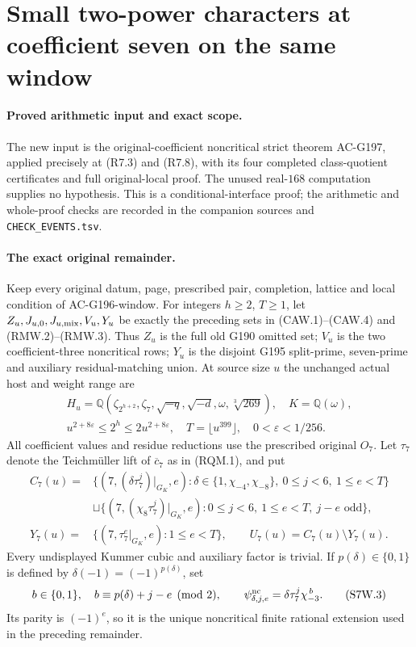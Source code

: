 \section{Small two-power characters at coefficient seven on the same window}
\label{sec:coefficient-seven-actual-window}

\paragraph{Proved arithmetic input and exact scope.}
The new input is the original-coefficient noncritical strict theorem
AC-G197, applied precisely at (R7.3) and (R7.8), with its four
completed class-quotient certificates and full original-local proof.
The unused real-$168$ computation supplies no hypothesis.
This is a conditional-interface proof; the arithmetic and whole-proof
checks are recorded in the companion sources and \texttt{CHECK\_EVENTS.tsv}.

\paragraph{The exact original remainder.}
Keep every original datum, page, prescribed pair, completion, lattice
and local condition of AC-G196-window. For integers $h\geq2$,
$T\geq1$, let $Z_u,J_{u,0},J_{u,\rm mix},V_u,Y_u$ be exactly
the preceding sets in (CAW.1)--(CAW.4) and (RMW.2)--(RMW.3).
Thus $Z_u$ is the full old G190 omitted set; $V_u$ is the two
coefficient-three noncritical rows; $Y_u$ is the disjoint G195
split-prime, seven-prime and auxiliary residual-matching union.
At source size $u$ the unchanged actual host and weight range are
\[
 \begin{gathered}
 H_u=\mathbb Q(\zeta_{2^{h+2}},\zeta_7,\sqrt{-q},\sqrt{-d},
                          \omega,\sqrt[3]{269}),\quad K=\mathbb Q(\omega),\\
 u^{2+8\varepsilon}\leq2^h\leq2u^{2+8\varepsilon},\quad
 T=\lfloor u^{399}\rfloor,\quad0<\varepsilon<1/256.
 \end{gathered}\tag{S7W.1}
\]
All coefficient values and residue reductions use the prescribed
original $O_7$. Let $\tau_7$ denote the Teichm\"uller lift of
$\overline c_7$ as in (RQM.1), and put
\[
 \begin{split}
 C_7(u)={}&\{(7,(\delta\tau_7^j)|_{G_K},e):
       \delta\in\{1,\chi_{-4},\chi_{-8}\},\ 0\leq j<6,\ 1\leq e<T\}\\
 &\sqcup\{(7,(\chi_8\tau_7^j)|_{G_K},e):
                    0\leq j<6,\ 1\leq e<T,\ j-e\text{ odd}\},\\
 Y_7(u)={}&\{(7,\tau_7^e|_{G_K},e):1\leq e<T\},\qquad
 U_7(u)=C_7(u)\setminus Y_7(u).
 \end{split}\tag{S7W.2}
\]
Every undisplayed Kummer cubic and auxiliary factor is trivial.
If $p(\delta)\in\{0,1\}$ is defined by
$\delta(-1)=(-1)^{p(\delta)}$, set
\[
 b\in\{0,1\},\quad b\equiv p(\delta)+j-e\pmod2,\qquad
 \psi^{\rm nc}_{\delta,j,e}=\delta\tau_7^j\chi_{-3}^{\,b}.
 \tag{S7W.3}
\]
Its parity is $(-1)^e$, so it is the unique noncritical finite
rational extension used in the preceding remainder.

